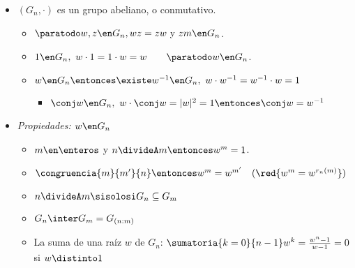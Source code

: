 \begin{itemize}[label=\color{gray} \tiny {}]
  \item $(G_n, \cdot)$ es un grupo abeliano, o conmutativo.
        \begin{itemize}
          \item $\paratodo w, z \en G_n, w z = z  w \text{ y } z m \en G_n$.

          \item $1 \en G_n,\ w \cdot 1 = 1 \cdot w = w \qquad \paratodo w \en G_n$.

          \item $w \en G_n \entonces \existe w^{-1} \en G_n,\ w \cdot w^{-1} = w^{-1}\cdot w = 1$
                \begin{itemize}
                  \item $\conj w \en G_n,\ w \cdot \conj w = |w|^2 = 1 \entonces \conj w = w^{-1}$
                \end{itemize}
        \end{itemize}

  \item \hypertarget{teoria6:propiedadesGn}{\textit{Propiedades: $w \en G_n$}}

        \begin{itemize}
          \item $m \en \enteros$ y $n \divideA m \entonces w^m = 1$.

          \item $\congruencia{m}{m'}{n} \entonces w^m = w^{m'} \quad (\red{w^m = w^{r_n(m)}})$

          \item $n \divideA m \sisolosi G_n \subseteq G_m$

          \item $G_n \inter G_m = G_{(n:m)}$

          \item La suma de una raíz $w$ de $G_n$:
                $\sumatoria{k=0}{n-1}w^k = \frac{w^n -1}{w -1} = 0$ si $w \distinto 1$
        \end{itemize}

\end{itemize}
